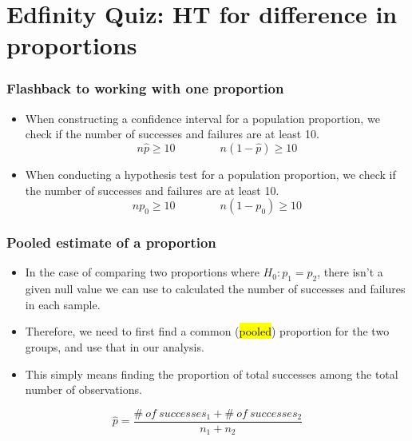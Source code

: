 \documentclass[slidestop,compress,mathserif]{beamer}
\begin{document}
\section{Edfinity Quiz: HT for difference in proportions}

\begin{frame}
\frametitle{Flashback to working with one proportion}

\begin{itemize}

\item When constructing a confidence interval for a population proportion, we check if the  number of successes and failures are at least 10.
\[ n\hat{p} \ge 10 \qquad \qquad n(1-\hat{p}) \ge 10 \]

\pause

\item When conducting a hypothesis test for a population proportion, we check if the  number of successes and failures are at least 10.
\[ np_0 \ge 10 \qquad \qquad n(1-p_0) \ge 10 \]

\end{itemize}

\end{frame}


\begin{frame}
\frametitle{Pooled estimate of a proportion}

\begin{itemize}

\item In the case of comparing two proportions where $H_0: p_1 = p_2$, there isn't a given null value we can use to calculated the  number of successes and failures in each sample.

\pause

\item Therefore, we need to first find a common (\hl{pooled}) proportion for the two groups, and use that in our analysis.

\pause

\item This simply means finding the proportion of total successes among the total number of observations.

\end{itemize}

$\:$ \\

{ \[ \hat{p} = \frac{\#~of~successes_1 + \#~of~successes_2}{n_1 + n_2} \] }

\end{frame}
\end{document}
